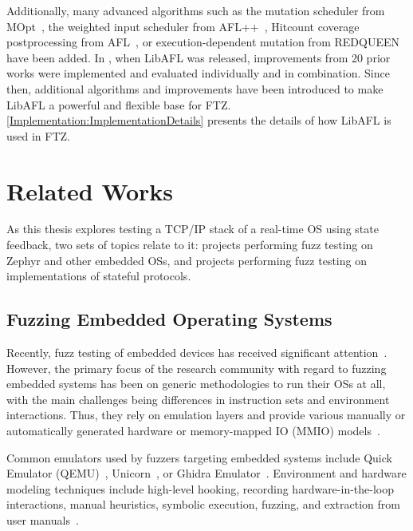 \documentclass[twocolumn]{article}
\newcommand{\proj}{FTZ\xspace}
\let\savedCite=\cite
\renewcommand{\cite}{\unskip~\savedCite}
\begin{document}
Additionally, many advanced algorithms such as the mutation scheduler from MOpt\cite{MOpt}, the weighted input scheduler from AFL++\cite{AFLPlusPlus}, Hitcount coverage postprocessing from AFL\cite{AFL}, or execution-dependent mutation from REDQUEEN\cite{REDQUEEN} have been added. In \citeyear{LibAFL}, when LibAFL was released, improvements from 20 prior works were implemented and evaluated individually and in combination. Since then, additional algorithms and improvements have been introduced to make LibAFL a powerful and flexible base for \proj.\cite{LibAFL} \cref{Implementation:ImplementationDetails} presents the details of how LibAFL is used in \proj.


\section{Related Works}
\label{RelatedWorks}

As this thesis explores testing a TCP/IP stack of a real-time OS using state feedback, two sets of topics relate to it: projects performing fuzz testing on Zephyr and other embedded OSs, and projects performing fuzz testing on implementations of stateful protocols.

\subsection{Fuzzing Embedded Operating Systems}

Recently, fuzz testing of embedded devices has received significant attention\cite{EmbeddedReview}. However, the primary focus of the research community with regard to fuzzing embedded systems has been on generic methodologies to run their OSs at all, with the main challenges being differences in instruction sets and environment interactions. Thus, they rely on emulation layers and provide various manually or automatically generated hardware or memory-mapped IO (MMIO) models\cite{EmbeddedReview}.

Common emulators used by fuzzers targeting embedded systems include Quick Emulator (QEMU)\cite{HDFuzz,EmberIO,Tardis}, Unicorn\cite{Fuzzware,SplITS}, or Ghidra Emulator\cite{Esoteric,MultiFuzz}. Environment and hardware modeling techniques include high-level hooking, recording hardware-in-the-loop interactions, manual heuristics, symbolic execution, fuzzing, and extraction from user manuals\cite{EmbeddedReview}.
\end{document}
